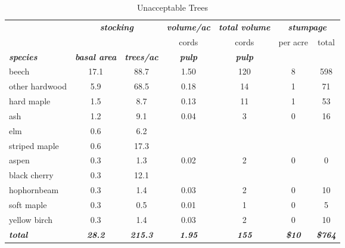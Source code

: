 \documentclass[landscape]{article}
\begin{document}
\begin{table}[H]

\caption{\label{tab:unnamed-chunk-15}Unacceptable Trees}
\fontsize{10}{12}\selectfont
\begin{tabular}[t]{lcccccc}
\toprule
\multicolumn{1}{c}{\em{\textbf{ }}} & \multicolumn{2}{c}{\em{\textbf{stocking}}} & \multicolumn{1}{c}{\em{\textbf{volume/ac }}} & \multicolumn{1}{c}{\em{\textbf{total volume}}} & \multicolumn{2}{c}{\em{\textbf{stumpage}}} \\
\cmidrule(l{3pt}r{3pt}){2-3} \cmidrule(l{3pt}r{3pt}){4-4} \cmidrule(l{3pt}r{3pt}){5-5} \cmidrule(l{3pt}r{3pt}){6-7}
\multicolumn{3}{c}{ } & \multicolumn{1}{c}{cords} & \multicolumn{1}{c}{cords} & \multicolumn{1}{c}{per acre} & \multicolumn{1}{c}{total} \\
\cmidrule(l{3pt}r{3pt}){4-4} \cmidrule(l{3pt}r{3pt}){5-5} \cmidrule(l{3pt}r{3pt}){6-6} \cmidrule(l{3pt}r{3pt}){7-7}
\rowcolor[HTML]{DCDCDC}  \em{\textbf{species}} & \em{\textbf{basal area}} & \em{\textbf{trees/ac}} & \em{\textbf{pulp}} & \em{\textbf{pulp}} & \em{\textbf{ }} & \em{\textbf{ }}\\
\midrule
\rowcolor{gray!6}  beech & 17.1 & 88.7 & 1.50 & 120 & 8 & 598\\
 
other hardwood & 5.9 & 68.5 & 0.18 & 14 & 1 & 71\\
 
\rowcolor{gray!6}  hard maple & 1.5 & 8.7 & 0.13 & 11 & 1 & 53\\
 
ash & 1.2 & 9.1 & 0.04 & 3 & 0 & 16\\
 
\rowcolor{gray!6}  elm & 0.6 & 6.2 &  &  &  & \\
 
striped maple & 0.6 & 17.3 &  &  &  & \\
 
\rowcolor{gray!6}  aspen & 0.3 & 1.3 & 0.02 & 2 & 0 & 0\\
 
black cherry & 0.3 & 12.1 &  &  &  & \\
 
\rowcolor{gray!6}  hophornbeam & 0.3 & 1.4 & 0.03 & 2 & 0 & 10\\
 
soft maple & 0.3 & 0.5 & 0.01 & 1 & 0 & 5\\
 
\rowcolor{gray!6}  yellow birch & 0.3 & 1.4 & 0.03 & 2 & 0 & 10\\
 
\rowcolor[HTML]{DCDCDC}  \em{\textbf{total}} & \em{\textbf{28.2}} & \em{\textbf{215.3}} & \em{\textbf{1.95}} & \em{\textbf{155}} & \em{\textbf{\$10}} & \em{\textbf{\$764}}\\
\bottomrule
\end{tabular}
\end{table}
\end{document}
